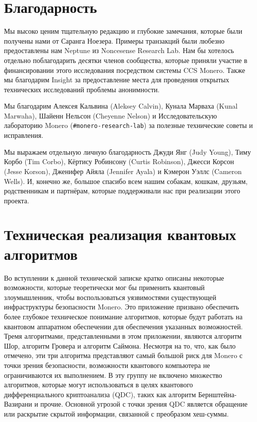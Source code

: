 \documentclass{mrl}
\begin{document}
\section{Благодарность}

Мы высоко ценим тщательную редакцию и глубокие замечания, которые были получены нами от Саранга Ноезера. Примеры транзакций были любезно предоставлены нам Neptune из Noncesense Research Lab. Нам бы хотелось отдельно поблагодарить десятки членов сообщества, которые приняли участие в финансировании этого исследования посредством системы CCS Monero. Также мы благодарим Insight за предоставление места для проведения открытых технических исследований проблемы анонимности.

Мы благодарим Алексея Кальвина (Aleksey Calvin), Кунала Марваха (Kunal Marwaha), Шайенн Нельсон (Cheyenne Nelson) и Исследовательскую лабораторию Monero (\texttt{\#monero-research-lab}) за полезные технические советы и исправления.

Мы выражаем отдельную личную благодарность Джуди Янг (Judy Young), Тиму Корбо (Tim Corbo), Кёртису Робинсону (Curtis Robinson), Джесси Корсон (Jesse Korson), Дженифер Айяла (Jennifer Ayala) и Кэмерон Уэллс (Cameron Wells). И, конечно же, большое спасибо всем нашим собакам, кошкам, друзьям, родственникам и партнёрам, которые поддерживали нас при реализации этого проекта.

\appendix

\section{Техническая реализация квантовых алгоритмов}\label{app:quantumalgos}
Во вступлении к данной технической записке кратко описаны некоторые возможности, которые теоретически мог бы применить квантовый злоумышленник, чтобы воспользоваться уязвимостями существующей инфраструктуры безопасности Monero. Это приложение призвано обеспечить более глубокое техническое понимание алгоритмов, которые будут работать на квантовом аппаратном обеспечении для обеспечения указанных возможностей. Тремя алгоритмами, представленными в этом приложении, являются алгоритм Шор, алгоритм Гровера и алгоритм Саймона. Несмотря на то, что, как было отмечено, эти три алгоритма представляют самый большой риск для Monero с точки зрения безопасности, возможности квантового компьютера не ограничиваются их выполнением. В эту группу не включено множество алгоритмов, которые могут использоваться в целях квантового дифференциального криптоанализа (QDC), таких как алгоритм Бернштейна-Вазирани и прочие. Основной угрозой с точки зрения QDC является обращение или раскрытие скрытой информации, связанной с преобразом хеш-суммы.
\end{document}
